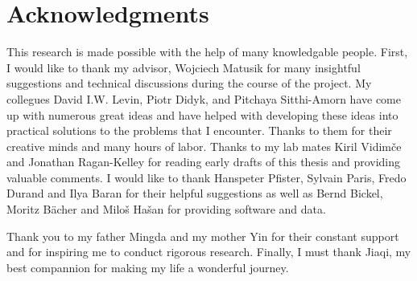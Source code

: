 
\chapter*{Acknowledgments}
\label{chap:ack}

This research is made possible with the help of many knowledgable people.
First, I would like to thank my advisor, Wojciech Matusik for many insightful suggestions and technical discussions
during the course of the project.
My collegues David I.W. Levin, Piotr Didyk, and Pitchaya Sitthi-Amorn have come up
with numerous great ideas and 
have helped with developing these ideas into practical solutions to the problems that I encounter.
Thanks to them for their creative minds and many hours of labor.
Thanks to my lab mates Kiril Vidim\v{c}e and Jonathan Ragan-Kelley for reading early drafts of this thesis and
providing valuable comments.
I would like to thank Hanspeter Pfister, Sylvain Paris, Fredo Durand and Ilya Baran for their helpful suggestions as well as Bernd Bickel, Moritz B\"{a}cher and  Milo\v{s} Ha\v{s}an for providing software and data.

Thank you to my father Mingda and my mother Yin for their constant support
and for inspiring me to conduct rigorous research.
Finally, I must thank Jiaqi, my best compannion for making my life a wonderful journey.